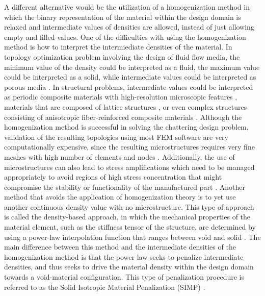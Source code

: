 \documentclass[../main.tex]{subfiles}
\begin{document}
A different alternative would be the utilization of a homogenization method \cite{Bendsoe 1995, Allaire 2001} \cite{suzukiHomogenizationMethodShape1991} in which the binary representation of the material within the design domain is relaxed and intermediate values of densities are allowed, instead of just allowing empty and filled-values. One of the difficulties with using the homogenization method is how to interpret the intermiediate densities of the material. In topology optimization problem involving the design of fluid flow media, the minimum value of the density could be interpreted as a fluid, the maximum value could be interpreted as a solid, while intermediate values could be interpreted as porous media \cite{pietropaoliThreedimensionalFluidTopology2019}. In structural problems, intermediate values could be interpreted as periodic composite materials with high-resolution microscopic features \cite{groenHomogenizationbasedTopologyOptimization2018} \cite{alexandersenTopologyOptimisationManufacturable2015}, materials that are composed of lattice structures \cite{allaireTopologyOptimizationModulated2019}, or even complex structures consisting of anisotropic fiber-reinforced composite materials \cite{kimTopologyOptimizationFunctionally2020}. Although the homogenization method is successful in solving the chattering design problem, validation of the resulting topologies using most FEM software are very computationally expensive, since the resulting microstructures requires very fine meshes with high number of elements and nodes \cite{kimComputationalHomogenizationAdditively2022}. Additionally, the use of microstructures can also lead to stress amplifications which need to be managed appropriately to avoid regions of high stress concentration that might compromise the stability or functionality of the manufactured part \cite{allaireTopologyOptimizationMinimum2004}.
{}
Another method that avoids the application of homogenization theory is to yet use another continuous density value with no microstructure. This type of approach is called the density-based approach, in which the mechanical properties  of the material element, such as the stiffness tensor of the structure, are determined by using a power-law interpolation function that ranges between void and solid \cite{Martin Sigmun 1999}. The main difference between this method and the intermediate densities of the homogenization method is that the power law seeks to penalize intermediate densities, and thus seeks to drive the material density within the design domain towards a void-material configuration. This type of penalization procedure is referred to as the Solid Isotropic Material Penalization (SIMP) \cite {Bensoe and Kikuchi 1989} \cite{ Rozvany and Zhou 1992}. 
\end{document}
